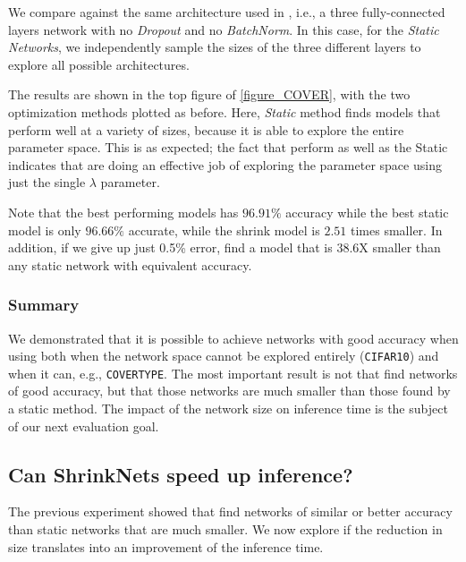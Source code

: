 We compare \shrink against the same architecture
used in \cite{Scardapane2017}, i.e., a three fully-connected layers network with no
\textit{Dropout} \cite{Srivastava2014} and no \textit{BatchNorm}. 
In this case, for the \textit{Static Networks}, we independently sample the
sizes of the three different layers to explore all possible architectures.

The results are shown in the top figure of \cref{figure_COVER}, with the two
optimization methods plotted as before. Here, {\it Static} method finds models
that perform well at a variety of sizes, because it is able to explore the
entire parameter space.  This is as expected;  the fact that \shrink perform
as well as the Static indicates that \shrink are doing an effective job of
exploring the parameter space using just the single $\lambda$ parameter.

Note that the best performing \shrink models has $96.91\%$ accuracy while the
best static model is only $96.66\%$ accurate, while the \shrink shrink model is $2.51$
times smaller. In addition, if we give up just 0.5\% error, \shrink find a
model that is 38.6X smaller than any static network with equivalent accuracy.


\subsubsection{Summary}

We  demonstrated that it is possible to achieve networks with good accuracy
when using \shrink both when the network space cannot be explored entirely
(\texttt{CIFAR10}) and when it can, e.g., \texttt{COVERTYPE}. The most important
result is not that \shrink find networks of good accuracy, but that those
networks are much smaller than those found by a static method. The impact of the
network size on inference time is the subject of our next evaluation goal.


\subsection{Can ShrinkNets speed up inference?}

The previous experiment showed that \shrink find networks of similar or better accuracy
than static networks that are much smaller. We now explore if the reduction in size
translates into an improvement of the inference time.

